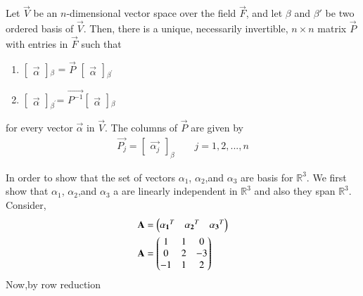 \begin{theorem} \label{eq:solutions/2/3/4/1}
Let $\vec{V}$ be an $n$-dimensional vector space over the field $\vec{F}$, and let $\beta$ and $\beta'$ be two ordered basis of $\vec{V}$. Then, there is a unique, necessarily invertible, $n\times n$ matrix $\vec{P}$ with entries in $\vec{F}$ such that 
\begin{enumerate}
	\item $\begin{bmatrix}
	\vec{\alpha}
	\end{bmatrix}$$_\beta$ = $\vec{P}$  $\begin{bmatrix}
	\vec{\alpha} 
\end{bmatrix}$$_{\beta^{'}}$
    \item $\begin{bmatrix}
    	\vec{\alpha}
    \end{bmatrix}$$_{\beta^{'}}$= $\vec{P^{-1}}$$\begin{bmatrix}
    \vec{\alpha}	
\end{bmatrix}$$_\beta$
\end{enumerate}
for every vector $\vec{\alpha}$ in $\vec{V}$. The columns of $\vec{P}$ are given by
\begin{align}
\vec{P_j} =  \begin{bmatrix}
	\vec{\alpha_j}
\end{bmatrix}_{\beta}	\qquad j = 1,2,...,n
\end{align}
\end{theorem}
In order to show that the set of vectors $\alpha_1$, $\alpha_2$,and $\alpha_3$  are basis for $\mathbb{R}^3$. We first show that $\alpha_1$, $\alpha_2$,and $\alpha_3$ a  are linearly independent in $\mathbb{R}^3$ and also they span $\mathbb{R}^3$. Consider,
\begin{align}
& \mathbf{A} = \begin{pmatrix}\mathbf{\alpha_1}^T & \mathbf{\alpha_2}^T & \mathbf{\alpha_3}^T \end{pmatrix} \\
& \mathbf{A} = \begin{pmatrix}1 & 1 &  0 \\ 0 & 2 & -3  \\ -1 & 1 & 2 \end{pmatrix}\label{eq:solutions/2/3/4/2}
\end{align}
Now,by row reduction

